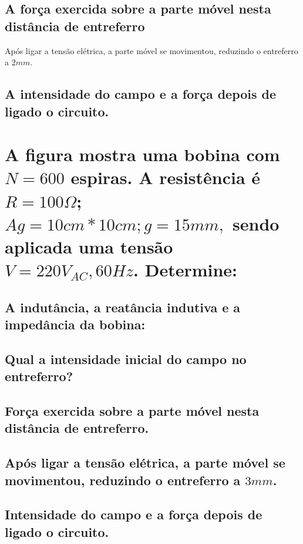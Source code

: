 \documentclass{article}
\begin{document}
\subsection{A força exercida sobre a parte móvel nesta distância de entreferro}
Após ligar a tensão elétrica, a parte móvel se movimentou, reduzindo o entreferro a \(2mm\).
\subsection{A intensidade do campo e a força depois de ligado o circuito.}
\section{A figura mostra uma bobina com \(N=600\) espiras. A resistência é \(R=100\Omega\); \(Ag=10cm*10cm; g= 15mm,\) sendo aplicada uma tensão \(V=220V_{AC}, 60Hz\). Determine:}
\subsection{A indutância, a reatância indutiva e a impedância da bobina:}
\subsection{Qual a intensidade inicial do campo no entreferro?}
\subsection{Força exercida sobre a parte móvel nesta distância de entreferro.}
\subsection{Após ligar a tensão elétrica, a parte móvel se movimentou, reduzindo o entreferro a \(3mm\).}
\subsection{Intensidade do campo e a força depois de ligado o circuito.}
\end{document}
